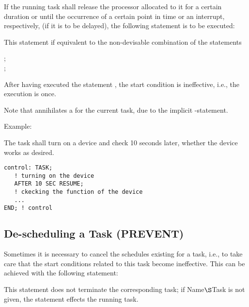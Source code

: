 If the running task shall release the processor allocated to it for a
certain duration or until the occurrence of a certain point in time or an
interrupt, respectively, (if it is to be delayed), the following
statement is to be executed:

\begin{grammarframe}
\end{grammarframe}

This statement if equivalent to the non-devisable combination of
the statements

;\\
;

After having executed the statement 
, the start condition is
ineffective, i.e., the execution is once.

Note that  annihilates a 
for the current task, due to the implicit -statement.

Example:

The task  shall turn on a device and check 10 seconds later,
whether the device works as desired.

\begin{lstlisting}
control: TASK;
   ! turning on the device
   AFTER 10 SEC RESUME;
   ! ckecking the function of the device
   ...
END; ! control
\end{lstlisting}

\subsection{De-scheduling a Task (PREVENT)}    %
\label{sec_prevent}

Sometimes it is necessary to cancel the schedules existing for a task,
i.e., to take care that the start conditions related to this task become
ineffective. This can be achieved with the following statement:

\begin{grammarframe}
\end{grammarframe}

This statement does not terminate the corresponding task; if
Name$\S $Task is not given, the statement effects the running task.

